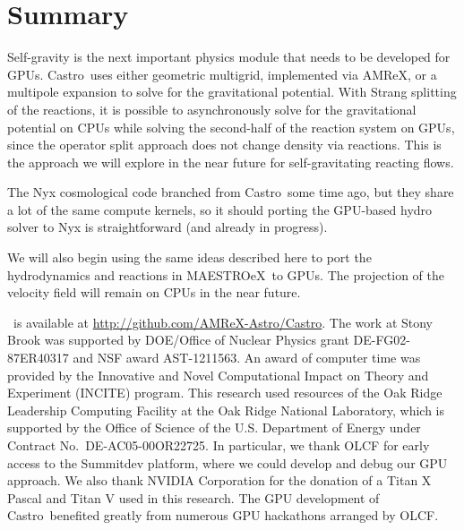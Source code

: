 \documentclass[twocolumn,times]{aastex62}
\newcommand{\castro}{{\sf Castro}}
\newcommand{\maestroex}{{\sf MAESTROeX}}
\begin{document}
\section{Summary}

Self-gravity is the next important physics module that needs to be
developed for GPUs.  \castro\ uses either geometric multigrid,
implemented via AMReX, or a multipole expansion to solve for the
gravitational potential.  With Strang splitting of the reactions, it
is possible to asynchronously solve for the gravitational potential on
CPUs while solving the second-half of the reaction system on GPUs,
since the operator split approach does not change density via
reactions.  This is the approach we will explore in the near future
for self-gravitating reacting flows.

The Nyx cosmological code branched from \castro\ some time ago, but
they share a lot of the same compute kernels, so it should porting the
GPU-based hydro solver to Nyx is straightforward (and already in
progress).

We will also begin using the same ideas described here to port the
hydrodynamics and reactions in \maestroex\ to GPUs.  The projection of
the velocity field will remain on CPUs in the near future.




\acknowledgements \castro\ is available at
\url{http://github.com/AMReX-Astro/Castro}.  The work at Stony Brook
was supported by DOE/Office of Nuclear Physics grant DE-FG02-87ER40317
and NSF award AST-1211563.  An award of computer time was provided by
the Innovative and Novel Computational Impact on Theory and Experiment
(INCITE) program.  This research used resources of the Oak Ridge
Leadership Computing Facility at the Oak Ridge National Laboratory,
which is supported by the Office of Science of the U.S. Department of
Energy under Contract No.\ DE-AC05-00OR22725.  In particular, we thank
OLCF for early access to the Summitdev platform, where we could
develop and debug our GPU approach.  We also thank NVIDIA Corporation
for the donation of a Titan X Pascal and Titan V used in this
research.  The GPU development of \castro\ benefited greatly from
numerous GPU hackathons arranged by OLCF.







\end{document}
